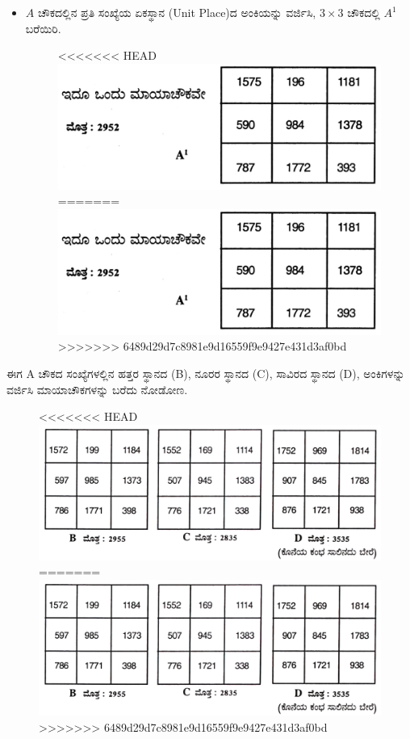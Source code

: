 \begin{itemize}
	\item $A$ ಚೌಕದಲ್ಲಿನ ಪ್ರತಿ ಸಂಖ್ಯೆಯ ಏಕಸ್ಥಾನ (Unit Place)ದ ಅಂಕಿಯನ್ನು ವರ್ಜಿಸಿ, $3 \times 3$ ಚೌಕದಲ್ಲಿ $A^1$ ಬರೆಯಿರಿ.
	\begin{figure}[H]
<<<<<<< HEAD
	\includegraphics{src/figures/chap7/fig7-9.jpg}
=======
	\includegraphics[scale=0.8]{src/figures/chap7/fig7.9.jpg}
>>>>>>> 6489d29d7c8981e9d16559f9e9427e431d3af0bd
	\end{figure}
\end{itemize}

ಈಗ A ಚೌಕದ ಸಂಖ್ಯೆಗಳಲ್ಲಿನ ಹತ್ತರ ಸ್ಥಾನದ (B), ನೂರರ ಸ್ಥಾನದ (C), ಸಾವಿರದ ಸ್ಥಾನದ (D), ಅಂಕಿಗಳನ್ನು ವರ್ಜಿಸಿ ಮಾಯಾಚೌಕಗಳನ್ನು ಬರೆದು ನೋಡೋಣ.
\begin{figure}[H]
<<<<<<< HEAD
\includegraphics{src/figures/chap7/fig7-10.jpg}
=======
\includegraphics[scale=0.85]{src/figures/chap7/fig7.10.jpg}
>>>>>>> 6489d29d7c8981e9d16559f9e9427e431d3af0bd
\end{figure}


